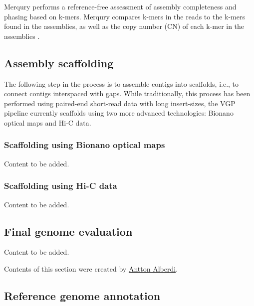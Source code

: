 \documentclass[
]{book}
\begin{document}
Merqury performs a reference-free assessment of assembly completeness and phasing based on k-mers. Merqury compares k-mers in the reads to the k-mers found in the assemblies, as well as the copy number (CN) of each k-mer in the assemblies \citep{Rhie2020-hw}.

\hypertarget{host-genome-scaffolding}{%
\subsection{Assembly scaffolding}\label{host-genome-scaffolding}}

The following step in the process is to assemble contigs into scaffolds, i.e., to connect contigs interspaced with gaps. While traditionally, this process has been performed using paired-end short-read data with long insert-sizes, the VGP pipeline currently scaffolds using two more advanced technologies: Bionano optical maps and Hi-C data.

\hypertarget{host-genome-scaffolding-bionano}{%
\subsubsection*{Scaffolding using Bionano optical maps}\label{host-genome-scaffolding-bionano}}

Content to be added.

\hypertarget{host-genome-scaffolding-hi-c}{%
\subsubsection*{Scaffolding using Hi-C data}\label{host-genome-scaffolding-hi-c}}

Content to be added.

\hypertarget{host-genome-final-evaluation}{%
\subsection{Final genome evaluation}\label{host-genome-final-evaluation}}

Content to be added.

Contents of this section were created by \protect\hyperlink{antton-alberdi}{Antton Alberdi}.

\hypertarget{host-genome-annotation}{%
\subsection{Reference genome annotation}\label{host-genome-annotation}}
\end{document}
